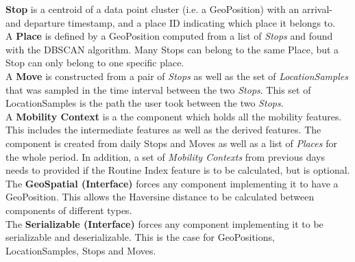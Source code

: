 \textbf{Stop} is a centroid of a data point cluster (i.e. a GeoPosition) with an arrival- and departure timestamp, and a place ID indicating which place it belongs to.\\

A \textbf{Place} is defined by a GeoPosition computed from a list of \textit{Stops} and found with the DBSCAN algorithm. Many Stops can belong to the same Place, but a Stop can only belong to one specific place.\\

A \textbf{Move} is constructed from a pair of \textit{Stops} as well as the set of \textit{LocationSamples} that was sampled in the time interval between the two \textit{Stops}. This set of LocationSamples is the path the user took between the two \textit{Stops}.\\

A \textbf{Mobility Context} is a the component which holds all the mobility features. This includes the intermediate features as well as the derived features. The component is created from daily Stops and Moves as well as a list of \textit{Places} for the whole period. In addition, a set of \textit{Mobility Contexts} from previous days needs to provided if the Routine Index feature is to be calculated, but is optional. \\

The \textbf{GeoSpatial (Interface)} forces any component implementing it to have a GeoPosition. This allows the Haversine distance to be calculated between components of different types.\\

The \textbf{Serializable (Interface)} forces any component implementing it to be serializable and deserializable. This is the case for GeoPositions, LocationSamples, Stops and Moves.
